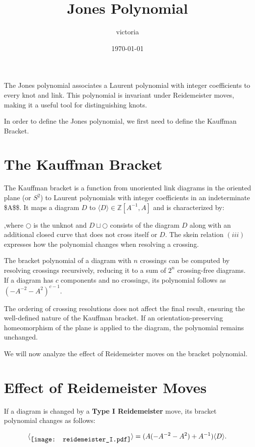\documentclass[11pt]{article}
\author{victoria}
\date{\today}
\title{Jones Polynomial}
\begin{document}
\maketitle
The Jones polynomial associates a Laurent polynomial with integer coefficients to every knot and link. This polynomial is invariant under Reidemeister moves, making it a useful tool for distinguishing knots.

In order to define the Jones polynomial, we first need to define the Kauffman Bracket.

\section{The Kauffman Bracket}

The Kauffman bracket is a function from unoriented link diagrams in the oriented plane (or \(S^2\)) to Laurent polynomials with integer coefficients in an indeterminate \$A\$\$. It maps a diagram \(D\) to \(\langle D \rangle \in \mathbb{Z}[A^{-1}, A]\) and is characterized by:

,where \(\bigcirc\) is the unknot and \(D \sqcup \bigcirc\) consists of the diagram \(D\) along with an additional closed curve that does not cross itself or \(D\). The skein relation \((iii)\) expresses how the polynomial changes when resolving a crossing.

The bracket polynomial of a diagram with \(n\) crossings can be computed by resolving crossings recursively, reducing it to a sum of \(2^n\) crossing-free diagrams. If a diagram has \(c\) components and no crossings, its polynomial follows as \((-A^{-2} - A^2)^{c-1}\).

The ordering of crossing resolutions does not affect the final result, ensuring the well-defined nature of the Kauffman bracket. If an orientation-preserving homeomorphism of the plane is applied to the diagram, the polynomial remains unchanged. 

We will now analyze the effect of Reidemeister moves on the bracket polynomial.

\section{Effect of Reidemeister Moves}

If a diagram is changed by a \textbf{Type I Reidemeister} move, its bracket polynomial changes as follows:

\begin{equation}
    \langle \raisebox{-0.15cm}{\texttt{[image: reidemeister\_I.pdf]}} \rangle = (A(-A^{-2} - A^2) + A^{-1}) \langle D \rangle.
\end{equation}
\end{document}
